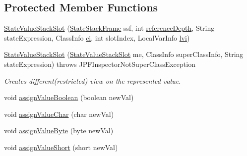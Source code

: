 \subsection*{Protected Member Functions}
\begin{DoxyCompactItemize}
\item 
\hyperlink{classgov_1_1nasa_1_1jpf_1_1inspector_1_1server_1_1programstate_1_1_state_value_stack_slot_a6addc1cee4ec49c656f1fcaa7b8d919d}{State\+Value\+Stack\+Slot} (\hyperlink{classgov_1_1nasa_1_1jpf_1_1inspector_1_1server_1_1programstate_1_1_state_stack_frame}{State\+Stack\+Frame} ssf, int \hyperlink{classgov_1_1nasa_1_1jpf_1_1inspector_1_1server_1_1programstate_1_1_state_node_a55683618625dae46e8aa68d95811d6bb}{reference\+Depth}, String state\+Expression, Class\+Info \hyperlink{classgov_1_1nasa_1_1jpf_1_1inspector_1_1server_1_1programstate_1_1_state_value_a0eb4aa1e630ed6372dcfb8c41ae7edc5}{ci}, int slot\+Index, Local\+Var\+Info \hyperlink{classgov_1_1nasa_1_1jpf_1_1inspector_1_1server_1_1programstate_1_1_state_value_stack_slot_a3f0fe3589b9a0511defcdce9502be964}{lvi})
\item 
\hyperlink{classgov_1_1nasa_1_1jpf_1_1inspector_1_1server_1_1programstate_1_1_state_value_stack_slot_a7c32ceb2f739acf92ca8f7c4bca93203}{State\+Value\+Stack\+Slot} (\hyperlink{classgov_1_1nasa_1_1jpf_1_1inspector_1_1server_1_1programstate_1_1_state_value_stack_slot}{State\+Value\+Stack\+Slot} me, Class\+Info super\+Class\+Info, String state\+Expression)  throws J\+P\+F\+Inspector\+Not\+Super\+Class\+Exception 
\begin{DoxyCompactList}\small\item\em Creates different(restricted) view on the represented value. \end{DoxyCompactList}\item 
void \hyperlink{classgov_1_1nasa_1_1jpf_1_1inspector_1_1server_1_1programstate_1_1_state_value_stack_slot_a54bbd189bc7a6b4725e19a9893c66271}{assign\+Value\+Boolean} (boolean new\+Val)
\item 
void \hyperlink{classgov_1_1nasa_1_1jpf_1_1inspector_1_1server_1_1programstate_1_1_state_value_stack_slot_a36006517921aecca69799ae0428b4eea}{assign\+Value\+Char} (char new\+Val)
\item 
void \hyperlink{classgov_1_1nasa_1_1jpf_1_1inspector_1_1server_1_1programstate_1_1_state_value_stack_slot_a0f588c70c45f037823811ebd845fcd5d}{assign\+Value\+Byte} (byte new\+Val)
\item 
void \hyperlink{classgov_1_1nasa_1_1jpf_1_1inspector_1_1server_1_1programstate_1_1_state_value_stack_slot_a66e1ae18d6ca286ef6cb836c57a06e00}{assign\+Value\+Short} (short new\+Val)

\end{DoxyCompactItemize}
